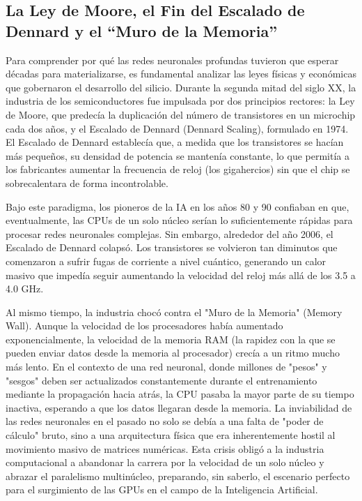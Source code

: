 \documentclass[12pt,a4paper]{article}
\begin{document}
\subsection{La Ley de Moore, el Fin del Escalado de Dennard y el ``Muro de la Memoria''}
Para comprender por qué las redes neuronales profundas tuvieron que esperar décadas para materializarse, es fundamental analizar las leyes físicas y económicas que gobernaron el desarrollo del silicio. Durante la segunda mitad del siglo XX, la industria de los semiconductores fue impulsada por dos principios rectores: la Ley de Moore, que predecía la duplicación del número de transistores en un microchip cada dos años, y el Escalado de Dennard (Dennard Scaling), formulado en 1974. El Escalado de Dennard establecía que, a medida que los transistores se hacían más pequeños, su densidad de potencia se mantenía constante, lo que permitía a los fabricantes aumentar la frecuencia de reloj (los gigahercios) sin que el chip se sobrecalentara de forma incontrolable.

Bajo este paradigma, los pioneros de la IA en los años 80 y 90 confiaban en que, eventualmente, las CPUs de un solo núcleo serían lo suficientemente rápidas para procesar redes neuronales complejas. Sin embargo, alrededor del año 2006, el Escalado de Dennard colapsó. Los transistores se volvieron tan diminutos que comenzaron a sufrir fugas de corriente a nivel cuántico, generando un calor masivo que impedía seguir aumentando la velocidad del reloj más allá de los 3.5 a 4.0 GHz. 

Al mismo tiempo, la industria chocó contra el "Muro de la Memoria" (Memory Wall). Aunque la velocidad de los procesadores había aumentado exponencialmente, la velocidad de la memoria RAM (la rapidez con la que se pueden enviar datos desde la memoria al procesador) crecía a un ritmo mucho más lento. En el contexto de una red neuronal, donde millones de "pesos" y "sesgos" deben ser actualizados constantemente durante el entrenamiento mediante la propagación hacia atrás, la CPU pasaba la mayor parte de su tiempo inactiva, esperando a que los datos llegaran desde la memoria. La inviabilidad de las redes neuronales en el pasado no solo se debía a una falta de "poder de cálculo" bruto, sino a una arquitectura física que era inherentemente hostil al movimiento masivo de matrices numéricas. Esta crisis obligó a la industria computacional a abandonar la carrera por la velocidad de un solo núcleo y abrazar el paralelismo multinúcleo, preparando, sin saberlo, el escenario perfecto para el surgimiento de las GPUs en el campo de la Inteligencia Artificial.
\end{document}
